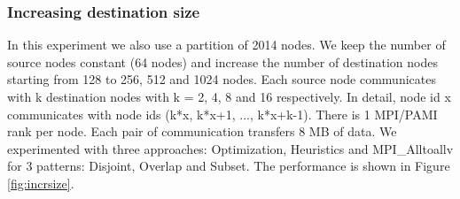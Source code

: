 \subsubsection{Increasing destination size}

In this experiment we also use a partition of 2014 nodes. We keep the number of source nodes constant (64 nodes) and increase the number of destination nodes starting from 128 to 256, 512 and 1024 nodes. Each source node communicates with k destination nodes with k = 2, 4, 8 and 16 respectively. In detail, node id x communicates with node ids (k*x, k*x+1, ..., k*x+k-1). There is 1 MPI/PAMI rank per node. Each pair of communication transfers 8 MB of data. We experimented with three approaches: Optimization, Heuristics and MPI\_Alltoallv for 3 patterns: Disjoint, Overlap and Subset. The performance is shown in Figure \ref{fig:incrsize}.

